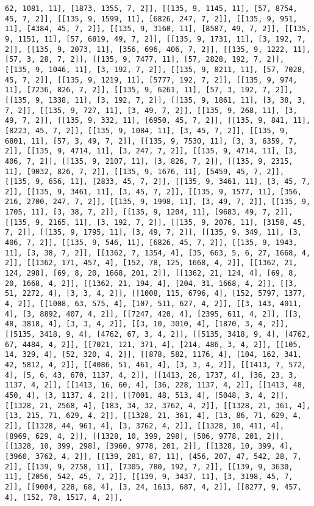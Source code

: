 \documentclass[12pt,fleqn]{article}\usepackage{../../common}
\begin{document}
\begin{verbatim}
62, 1081, 11], [1873, 1355, 7, 2]], [[135, 9, 1145, 11], [57, 8754, 45, 7, 2]], [[135, 9, 1599, 11], [6826, 247, 7, 2]], [[135, 9, 951, 11], [4384, 45, 7, 2]], [[135, 9, 3160, 11], [8587, 49, 7, 2]], [[135, 9, 1151, 11], [57, 6819, 49, 7, 2]], [[135, 9, 1731, 11], [3, 192, 7, 2]], [[135, 9, 2073, 11], [356, 696, 406, 7, 2]], [[135, 9, 1222, 11], [57, 3, 28, 7, 2]], [[135, 9, 7477, 11], [57, 2828, 192, 7, 2]], [[135, 9, 1046, 11], [3, 192, 7, 2]], [[135, 9, 8211, 11], [57, 7028, 45, 7, 2]], [[135, 9, 1219, 11], [5777, 192, 7, 2]], [[135, 9, 974, 11], [7236, 826, 7, 2]], [[135, 9, 6261, 11], [57, 3, 192, 7, 2]], [[135, 9, 1338, 11], [3, 192, 7, 2]], [[135, 9, 1861, 11], [3, 38, 3, 7, 2]], [[135, 9, 727, 11], [3, 49, 7, 2]], [[135, 9, 268, 11], [3, 49, 7, 2]], [[135, 9, 332, 11], [6950, 45, 7, 2]], [[135, 9, 841, 11], [8223, 45, 7, 2]], [[135, 9, 1084, 11], [3, 45, 7, 2]], [[135, 9, 6801, 11], [57, 3, 49, 7, 2]], [[135, 9, 7530, 11], [3, 3, 6359, 7, 2]], [[135, 9, 4714, 11], [3, 247, 7, 2]], [[135, 9, 4714, 11], [3, 406, 7, 2]], [[135, 9, 2107, 11], [3, 826, 7, 2]], [[135, 9, 2315, 11], [9032, 826, 7, 2]], [[135, 9, 1676, 11], [5459, 45, 7, 2]], [[135, 9, 656, 11], [2833, 45, 7, 2]], [[135, 9, 3461, 11], [3, 45, 7, 2]], [[135, 9, 3461, 11], [3, 45, 7, 2]], [[135, 9, 1577, 11], [356, 216, 2700, 247, 7, 2]], [[135, 9, 1998, 11], [3, 49, 7, 2]], [[135, 9, 1705, 11], [3, 38, 7, 2]], [[135, 9, 1204, 11], [9683, 49, 7, 2]], [[135, 9, 2165, 11], [3, 192, 7, 2]], [[135, 9, 2076, 11], [3158, 45, 7, 2]], [[135, 9, 1795, 11], [3, 49, 7, 2]], [[135, 9, 349, 11], [3, 406, 7, 2]], [[135, 9, 546, 11], [6826, 45, 7, 2]], [[135, 9, 1943, 11], [3, 38, 7, 2]], [[1362, 7, 1354, 4], [35, 663, 5, 6, 27, 1668, 4, 2]], [[1362, 171, 457, 4], [152, 78, 125, 1668, 4, 2]], [[1362, 21, 124, 298], [69, 8, 20, 1668, 201, 2]], [[1362, 21, 124, 4], [69, 8, 20, 1668, 4, 2]], [[1362, 21, 194, 4], [204, 31, 1668, 4, 2]], [[3, 51, 2272, 4], [3, 3, 4, 2]], [[1008, 115, 6796, 4], [152, 5797, 1377, 4, 2]], [[1008, 63, 575, 4], [107, 511, 627, 4, 2]], [[3, 143, 4011, 4], [3, 8892, 407, 4, 2]], [[7247, 420, 4], [2395, 611, 4, 2]], [[3, 48, 3818, 4], [3, 3, 4, 2]], [[3, 10, 3010, 4], [1870, 3, 4, 2]], [[5135, 3418, 9, 4], [4762, 67, 3, 4, 2]], [[5135, 3418, 9, 4], [4762, 67, 4484, 4, 2]], [[7021, 121, 371, 4], [214, 486, 3, 4, 2]], [[105, 14, 329, 4], [52, 320, 4, 2]], [[878, 582, 1176, 4], [104, 162, 341, 42, 5812, 4, 2]], [[4086, 51, 461, 4], [3, 3, 4, 2]], [[1413, 7, 572, 4], [5, 6, 43, 670, 1137, 4, 2]], [[1413, 26, 1737, 4], [36, 23, 3, 1137, 4, 2]], [[1413, 16, 60, 4], [36, 228, 1137, 4, 2]], [[1413, 48, 450, 4], [3, 1137, 4, 2]], [[7001, 48, 513, 4], [5048, 3, 4, 2]], [[1328, 21, 2568, 4], [183, 34, 32, 3762, 4, 2]], [[1328, 21, 361, 4], [13, 215, 71, 629, 4, 2]], [[1328, 21, 361, 4], [13, 86, 71, 629, 4, 2]], [[1328, 44, 961, 4], [3, 3762, 4, 2]], [[1328, 10, 411, 4], [8969, 629, 4, 2]], [[1328, 10, 399, 298], [506, 9778, 201, 2]], [[1328, 10, 399, 298], [3960, 9778, 201, 2]], [[1328, 10, 399, 4], [3960, 3762, 4, 2]], [[139, 281, 87, 11], [456, 207, 47, 542, 28, 7, 2]], [[139, 9, 2758, 11], [7305, 780, 192, 7, 2]], [[139, 9, 3630, 11], [2056, 542, 45, 7, 2]], [[139, 9, 3437, 11], [3, 3198, 45, 7, 2]], [[9004, 228, 68, 4], [3, 24, 1613, 687, 4, 2]], [[8277, 9, 457, 4], [152, 78, 1517, 4, 2]], 
\end{verbatim}
\end{document}
